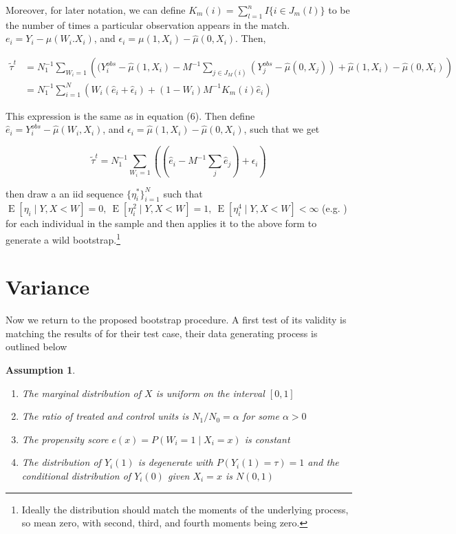 \documentclass{article}
\newtheorem{assumption}{Assumption}[section]
\DeclareMathOperator{\E}{E}
\begin{document}
Moreover, for later notation, we can define $K_{m}(i) = \sum_{l = 1}^{n}I\{i \in J_{m}(l)\}$ to be the number of times a particular observation appears in the match. $e_{i} = Y_{i}-\mu(W_{i}.X_{i})$, and $\epsilon_{i} =  \mu(1,X_{i})-\hat \mu(0,X_{i})$. Then,

\begin{align*} \tilde \tau^{t} &= N_{1}^{-1}\sum_{W_{i} = 1}\left((Y_{i}^{obs}-\hat \mu(1,X_{i}) -M^{-1}\sum_{j \in J_{M}(i)}(Y_{j}^{obs}-\hat \mu(0,X_{j}))+\hat \mu(1,X_{i})-\hat \mu(0,X_{i})\right) \\
&= N_{1}^{-1}\sum_{i=1}^{N}(W_{i}(\hat e_{i}+\hat \epsilon_{i})+(1-W_{i})M^{-1}K_{m}(i)\hat e_{i})
\end{align*}

This expression is the same as in \cite{OnR:16} equation (6). Then define $\hat e_{i} = Y_{i}^{obs}-\hat \mu(W_{i},X_{i})$, and $\epsilon_{i} = \hat \mu(1,X_{i})-\hat \mu(0,X_{i})$, such that we get

$$\tilde \tau^{t} = N_{1}^{-1}\sum_{W_{i} = 1}\left((\hat e_{i}-M^{-1}\sum_{j}\hat e_{j})+\epsilon_{i}\right)$$

\cite{OnR:16} then draw a an iid sequence $\{\eta_{i}^{*}\}_{i=1}^{N}$ such that $\E[\eta_{i} \mid Y, X< W] = 0,\ \E[\eta_{i}^{2} \mid Y, X< W] = 1,\ \E[\eta_{i}^{4} \mid Y, X< W] < \infty$ (e.g. \cite{Mam:92}) for each individual in the sample and then applies it to the above form to generate a wild bootstrap.\footnote{Ideally the distribution should match the moments of the underlying process, so mean zero, with second, third, and fourth moments being zero. }

\section{Variance}

Now we return to the proposed bootstrap procedure. A first test of its validity is matching the results of \cite{AnI:08} for their test case, their data generating process is outlined below

\begin{assumption}\label{asmp:ani}
\begin{enumerate}
\item The marginal distribution of $X$ is uniform on the interval $[0,1]$
\item The ratio of treated and control units is $N_{1}/N_{0} = \alpha$ for some $\alpha > 0$
\item The propensity score $e(x) = P(W_{i} = 1 \mid X_{i} = x)$ is constant
\item The distribution of $Y_{i}(1)$ is degenerate with $P(Y_{i}(1) = \tau) = 1$ and the conditional distribution of $Y_{i}(0)$ given $X_{i} = x$ is $N(0,1)$
\end{enumerate}
\end{assumption}
\end{document}
